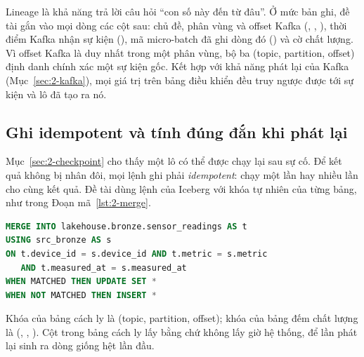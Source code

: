 Lineage là khả năng trả lời câu hỏi ``con số này đến từ đâu''. Ở mức bản ghi, đề tài gắn vào mọi dòng các cột sau: chủ đề, phân vùng và offset Kafka (, , ), thời điểm Kafka nhận sự kiện (), mã micro-batch đã ghi dòng đó () và cờ chất lượng. Vì offset Kafka là duy nhất trong một phân vùng, bộ ba (topic, partition, offset) định danh chính xác một sự kiện gốc. Kết hợp với khả năng phát lại của Kafka (Mục~\ref{sec:2-kafka}), mọi giá trị trên bảng điều khiển đều truy ngược được tới sự kiện và lô đã tạo ra nó.

\subsection{Ghi idempotent và tính đúng đắn khi phát lại}
\label{sec:2-idempotent}

Mục~\ref{sec:2-checkpoint} cho thấy một lô có thể được chạy lại sau sự cố. Để kết quả không bị nhân đôi, mọi lệnh ghi phải \emph{idempotent}: chạy một lần hay nhiều lần cho cùng kết quả. Đề tài dùng lệnh  của Iceberg với khóa tự nhiên của từng bảng, như trong Đoạn mã~\ref{lst:2-merge}.

\begin{lstlisting}[language=SQL, caption={Ghi idempotent bằng MERGE (\texttt{src/streaming/ddl.py})}, label={lst:2-merge}]
MERGE INTO lakehouse.bronze.sensor_readings AS t
USING src_bronze AS s
ON t.device_id = s.device_id AND t.metric = s.metric
   AND t.measured_at = s.measured_at
WHEN MATCHED THEN UPDATE SET *
WHEN NOT MATCHED THEN INSERT *
\end{lstlisting}

Khóa của bảng cách ly là (topic, partition, offset); khóa của bảng đếm chất lượng là (, , ). Cột  trong bảng cách ly lấy bằng  chứ không lấy giờ hệ thống, để lần phát lại sinh ra dòng giống hệt lần đầu.
